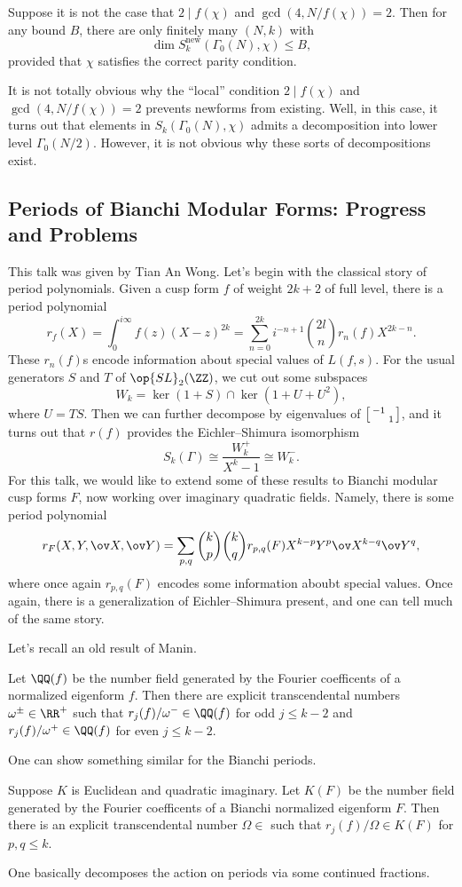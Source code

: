 \documentclass{article}
\begin{document}
\begin{theorem}
	Suppose it is not the case that $2\mid f(\chi)$ and $\gcd(4,N/f(\chi))=2$. Then for any bound $B$, there are only finitely many $(N,k)$ with
	\[\dim S_k^{\mathrm{new}}(\Gamma_0(N),\chi)\le B,\]
	provided that $\chi$ satisfies the correct parity condition.
\end{theorem}
\begin{remark}
	It is not totally obvious why the ``local'' condition $2\mid f(\chi)$ and $\gcd(4,N/f(\chi))=2$ prevents newforms from existing. Well, in this case, it turns out that elements in $S_k(\Gamma_0(N),\chi)$ admits a decomposition into lower level $\Gamma_0(N/2)$. However, it is not obvious why these sorts of decompositions exist.
\end{remark}

\subsection{Periods of Bianchi Modular Forms: Progress and Problems}
This talk was given by Tian An Wong. Let's begin with the classical story of period polynomials. Given a cusp form $f$ of weight $2k+2$ of full level, there is a period polynomial
\[r_f(X)=\int_0^{i\infty}f(z)(X-z)^{2k}=\sum_{n=0}^{2k}i^{-n+1}\binom{2l}nr_n(f)X^{2k-n}.\]
These $r_n(f)$s encode information about special values of $L(f,s)$. For the usual generators $S$ and $T$ of $\op{SL}_2(\ZZ)$, we cut out some subspaces
\[W_k=\ker(1+S)\cap\ker\left(1+U+U^2\right),\]
where $U=TS$. Then we can further decompose by eigenvalues of $\begin{bsmallmatrix}
	-1 \\ & 1
\end{bsmallmatrix}$, and it turns out that $r(f)$ provides the Eichler--Shimura isomorphism
\[S_k(\Gamma)\cong\frac{W_k^+}{X^k-1}\cong W^-_k.\]
For this talk, we would like to extend some of these results to Bianchi modular cusp forms $F$, now working over imaginary quadratic fields. Namely, there is some period polynomial
\[r_F(X,Y,\ov X,\ov Y)=\sum_{p,q}\binom kp\binom kqr_{p,q}(F)X^{k-p}Y^p\ov X^{k-q}\ov Y^q,\]
where once again $r_{p,q}(F)$ encodes some information aboubt special values. Once again, there is a generalization of Eichler--Shimura present, and one can tell much of the same story.

Let's recall an old result of Manin.
\begin{theorem}
	Let $\QQ(f)$ be the number field generated by the Fourier coefficents of a normalized eigenform $f$. Then there are explicit transcendental numbers $\omega^{\pm}\in\RR^+$ such that $r_j(f)/\omega^-\in\QQ(f)$ for odd $j\le k-2$ and $r_j(f)/\omega^+\in\QQ(f)$ for even $j\le k-2$.
\end{theorem}
One can show something similar for the Bianchi periods.
\begin{theorem}
	Suppose $K$ is Euclidean and quadratic imaginary. Let $K(F)$ be the number field generated by the Fourier coefficents of a Bianchi normalized eigenform $F$. Then there is an explicit transcendental number $\Omega\in$ such that $r_j(f)/\Omega\in K(F)$ for $p,q\le k$.
\end{theorem}
One basically decomposes the action on periods via some continued fractions.
\end{document}
